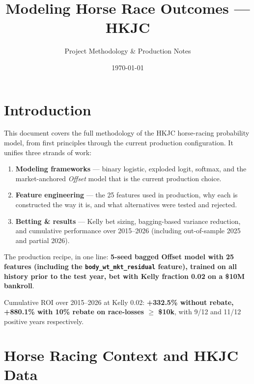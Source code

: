\documentclass[11pt]{article}
\title{Modeling Horse Race Outcomes --- HKJC}
\author{Project Methodology \& Production Notes}
\date{\today}
\begin{document}
\maketitle

\tableofcontents
\vspace{1em}

\section{Introduction}

This document covers the full methodology of the HKJC horse-racing probability
model, from first principles through the current production configuration. It
unifies three strands of work:

\begin{enumerate}\item \textbf{Modeling frameworks} --- binary logistic, exploded logit,
      softmax, and the market-anchored \emph{Offset} model that is the
      current production choice.
\item \textbf{Feature engineering} --- the 25 features used in production,
      why each is constructed the way it is, and what alternatives were
      tested and rejected.
\item \textbf{Betting \& results} --- Kelly bet sizing, bagging-based
      variance reduction, and cumulative performance over 2015--2026
      (including out-of-sample 2025 and partial 2026).
\end{enumerate}

The production recipe, in one line: \textbf{5-seed bagged Offset model
with 25 features (including the \texttt{body\_wt\_mkt\_residual} feature),
trained on all history prior to the test year, bet with Kelly
fraction 0.02 on a \$10M bankroll}.

Cumulative ROI over 2015--2026 at Kelly 0.02: \textbf{+332.5\% without
rebate, +880.1\% with 10\% rebate on race-losses $\geq$ \$10k},
with 9/12 and 11/12 positive years respectively.

\section{Horse Racing Context and HKJC Data}
\end{document}
